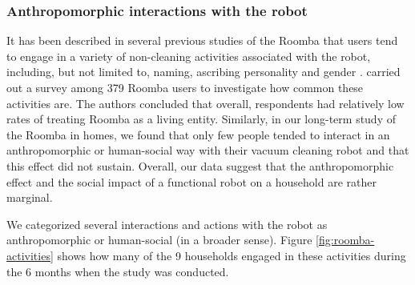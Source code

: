 \documentclass{frontiersSCNS} %
\begin{document}



\subsubsection{Anthropomorphic interactions with the robot\\}

It has been described in several previous studies of the Roomba that users tend
to engage in a variety of non-cleaning activities associated with the robot,
including, but not limited to, naming, ascribing personality and gender
\citep{forlizzi_service_2006,forlizzi_how_2007,krumm_my_2007,sung_domestic_2010}.
\cite{sung_housewives_2008} carried out a survey among 379 Roomba users to
investigate how common these activities are. The authors concluded that overall,
respondents had relatively low rates of treating Roomba as a living entity.  
Similarly, in our long-term study of the Roomba in homes, we found that only few 
people tended to interact in an anthropomorphic or human-social way with their 
vacuum cleaning robot and that this effect did not sustain. Overall, our data 
suggest that the anthropomorphic effect and the social
impact of a functional robot on a household are rather marginal.

We categorized several interactions and actions with the robot as
anthropomorphic or human-social (in a broader sense). 
Figure \ref{fig:roomba-activities} shows how many of the 9 households engaged
in these activities during the 6 months when the study was conducted. 
\end{document}

